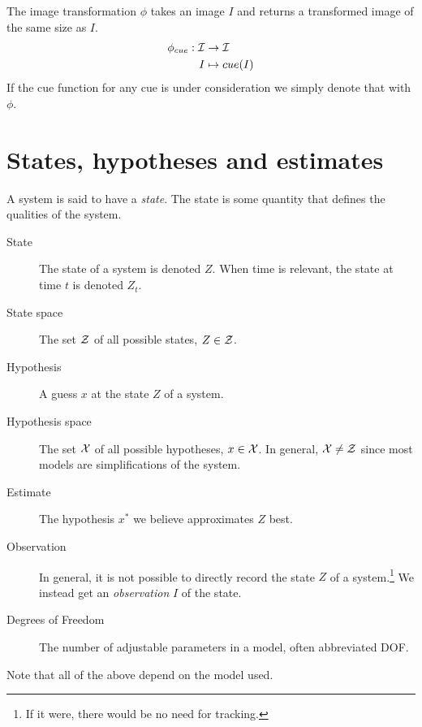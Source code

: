 \begin{definition}
    The image transformation $\phi$ takes an image $I$ and returns a transformed image of the same size as $I$.
    \begin{equation}
        \begin{split}
            \phi_{cue} : \mathcal{I} &\rightarrow \mathcal{I}\\
                I &\mapsto cue(I)
        \end{split}
    \end{equation}
    If the cue function for any cue is under consideration we simply denote that with $\phi$.
\end{definition}


\section{States, hypotheses and estimates}
A system is said to have a \emph{state}. The state is some quantity that defines the qualities of the system.

\begin{description}
\item[State] The state of a system is denoted $Z$. When time is relevant, the state at time $t$ is denoted $Z_t$.
\item[State space] The set $\mathcal{Z}$ of all possible states, $Z \in \mathcal{Z}$.
\item[Hypothesis] A guess $x$ at the state $Z$ of a system.
\item[Hypothesis space] The set $\mathcal{X}$ of all possible hypotheses, $x \in \mathcal{X}$. In general, $\mathcal{X} \neq \mathcal{Z}$ since most models are simplifications of the system.
\item[Estimate] The hypothesis $x^*$ we believe approximates $Z$ best.
\item[Observation]
In general, it is not possible to directly record the state $Z$ of a system.\footnote{If it were, there would be no need for tracking.} We instead get an \emph{observation} $I$ of the state.
\item[Degrees of Freedom] The number of adjustable parameters in a model, often abbreviated DOF.
\end{description}

Note that all of the above depend on the  model used.

%


